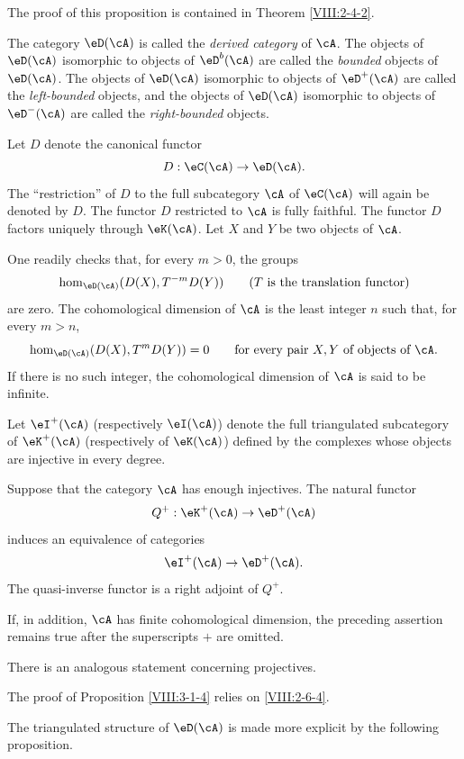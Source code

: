 The proof of this proposition is contained in Theorem \ref{VIII:2-4-2}.

\begin{definition}\label{VIII:3-1-3}
The category $\eD(\cA)$ is called the \emph{derived category} of $\cA$.
The objects of $\eD(\cA)$ isomorphic to objects of $\eD^b(\cA)$ are
called the \emph{bounded} objects of $\eD(\cA)$. The objects of
$\eD(\cA)$ isomorphic to objects of $\eD^+(\cA)$ are called the
\emph{left-bounded} objects, and the objects of $\eD(\cA)$ isomorphic to
objects of $\eD^-(\cA)$ are called the \emph{right-bounded} objects.
\end{definition}

Let $D$ denote the canonical functor
\[
  D : \eC(\cA) \to \eD(\cA) \text{.}
\]
The “restriction” of $D$ to the full subcategory $\cA$ of $\eC(\cA)$
will again be denoted by $D$. The functor $D$ restricted to $\cA$ is fully
faithful. The functor $D$ factors uniquely through $\eK(\cA)$. Let $X$
and $Y$ be two objects of $\cA$.

One readily checks that, for every $m>0$, the groups
\[
  \hom_{\eD(\cA)}(D(X),T^{-m} D(Y)) \qquad \text{($T$ is the translation functor)}
\]
are zero. The cohomological dimension of $\cA$ is the least integer $n$
such that, for every $m>n$,
\[
  \hom_{\eD(\cA)}(D(X),T^m D(Y)) = 0 \qquad\text{for every pair $X,Y$ of objects of $\cA$.}
\]
If there is no such integer, the cohomological dimension of $\cA$ is said
to be infinite.

Let $\eI^+(\cA)$ (respectively $\eI(\cA)$) denote the full triangulated
subcategory of $\eK^+(\cA)$ (respectively of $\eK(\cA)$) defined by the
complexes whose objects are injective in every degree.

\begin{proposition}\label{VIII:3-1-4}
Suppose that the category $\cA$ has enough injectives. The natural functor
\[
  Q^+:\eK^+(\cA) \to \eD^+(\cA)
\]
induces an equivalence of categories
\[
  \eI^+(\cA) \to \eD^+(\cA)  \text{.}
\]
The quasi-inverse functor is a right adjoint of $Q^+$.
\end{proposition}

If, in addition, $\cA$ has finite cohomological dimension, the preceding
assertion remains true after the superscripts $+$ are omitted.

There is an analogous statement concerning projectives.

The proof of Proposition \ref{VIII:3-1-4} relies on
\ref{VIII:2-6-4}.

The triangulated structure of $\eD(\cA)$ is made more explicit by the
following proposition.

